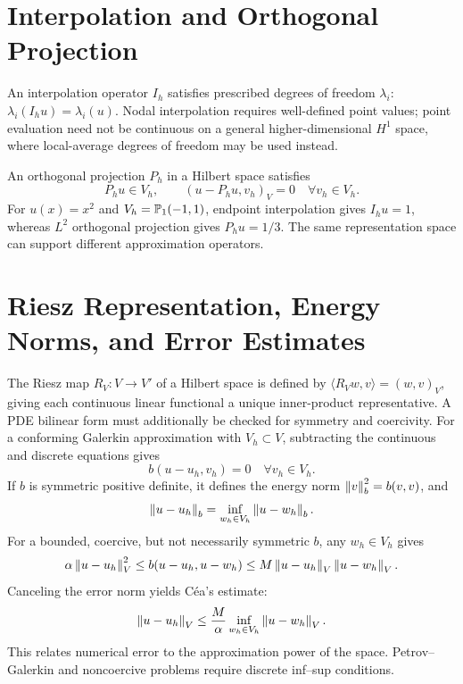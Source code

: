 \section{Interpolation and Orthogonal Projection}
An interpolation operator $I_h$ satisfies prescribed degrees of freedom $\lambda_i$:
$\lambda_i(I_hu)=\lambda_i(u)$. Nodal interpolation requires well-defined point values;
point evaluation need not be continuous on a general higher-dimensional $H^1$ space, where local-average degrees of freedom may be used instead.

An orthogonal projection $P_h$ in a Hilbert space satisfies
\[
P_hu\in V_h,\qquad (u-P_hu,v_h)_V=0\quad\forall v_h\in V_h.
\]
For $u(x)=x^2$ and $V_h=\mathbb P_1(-1,1)$, endpoint interpolation gives $I_hu=1$,
whereas $L^2$ orthogonal projection gives $P_hu=1/3$.
The same representation space can support different approximation operators.

\section{Riesz Representation, Energy Norms, and Error Estimates}
The Riesz map $R_V:V\to V'$ of a Hilbert space is defined by
$\langle R_Vw,v\rangle=(w,v)_V$,
giving each continuous linear functional a unique inner-product representative. A PDE bilinear form must additionally be checked for symmetry and coercivity.
For a conforming Galerkin approximation with $V_h\subset V$, subtracting the continuous and discrete equations gives
\[
b(u-u_h,v_h)=0\quad\forall v_h\in V_h.
\]
If $b$ is symmetric positive definite, it defines the energy norm $\left\lVert v\right\rVert_b^2=b(v,v)$, and
\[
\left\lVert u-u_h\right\rVert_b=\inf_{w_h\in V_h}\left\lVert u-w_h\right\rVert_b.
\]
For a bounded, coercive, but not necessarily symmetric $b$, any $w_h\in V_h$ gives
\[
\alpha\left\lVert u-u_h\right\rVert_V^2
\le b(u-u_h,u-w_h)
\le M\left\lVert u-u_h\right\rVert_V\left\lVert u-w_h\right\rVert_V.
\]
Canceling the error norm yields C\'ea's estimate:
\[
\left\lVert u-u_h\right\rVert_V\le\frac{M}{\alpha}
\inf_{w_h\in V_h}\left\lVert u-w_h\right\rVert_V.
\]
This relates numerical error to the approximation power of the space. Petrov--Galerkin and noncoercive problems require discrete inf--sup conditions.

